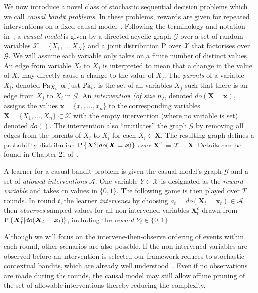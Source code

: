 \newcommand{\bernoulli}{\operatorname{Bernoulli}}
\newcommand{\dirac}{\operatorname{Dirac}}
\renewcommand{\vec}[1]{\boldsymbol{#1}}

We now introduce a novel class of stochastic sequential decision problems which we call \emph{causal bandit problems}. 
In these problems, rewards are given for repeated interventions on a fixed causal model~\cite{Pearl2000}. 
Following the terminology and notation in~\cite{Koller2009}, a \emph{causal model} is given by a directed acyclic graph $\mathcal{G}$ over a set of random variables $\mathcal{X} = \{ X_1, \ldots, X_N \}$ and a joint distribution $\mathrm{P}$ over $\mathcal{X}$ that factorises over $\mathcal{G}$.
We will assume each variable only takes on a finite number of distinct values.
An edge from variable $X_i$ to $X_j$ is interpreted to mean that a change in the value of $X_i$ may directly cause a change to the value of $X_j$.
The \emph{parents} of a variable $X_i$, denoted $\operatorname{Pa}_{X_i}$ or just $\operatorname{Pa}_{i}$, is the set of all variables $X_j$ such that there is an edge from $X_j$ to $X_i$ in $\mathcal{G}$.
An \emph{intervention (of size $n$)}, denoted $do(\vec{X}=\vec{x})$, assigns the values $\vec{x}=\{x_1, \ldots, x_n\}$ to the corresponding variables $\vec{X}=\{X_1, \ldots, X_n\} \subset \mathcal{X}$ with the empty intervention (where no variable is set) denoted $do()$.
The intervention also ``mutilates'' the graph $\mathcal{G}$ by removing all edges from the parents of $X_i$ to $X_i$ for each $X_i \in \vec{X}$. 
The resulting graph defines a probability distribution $\P{\vec{X}^c | do(\vec{X}=\vec{x})}$ over $\vec{X}^c := \mathcal{X} - \vec{X}$. 
Details can be found in Chapter 21 of~\cite{Koller2009}.

A learner for a casual bandit problem is given the casual model's graph $\mathcal{G}$ and a set of \emph{allowed interventions} $\mathcal{A}$.
One variable $Y \in \mathcal{X}$ is designated as the \emph{reward variable} and takes on values in $\{0, 1\}$.
The following game is then played over $T$ rounds.
In round $t$, the learner \emph{intervenes} by choosing $a_t = do(\vec{X}_t = \vec{x}_t) \in \mathcal{A}$ then \emph{observes} sampled values for all non-intervened variables $\vec{X}^c_t$ drawn from $\P{\vec{X}^c_t | do(\vec{X}_t = \vec{x}_t)}$, including the \emph{reward} $Y_t \in \{0,1\}$. 

Although we will focus on the intervene-then-observe ordering of events within each round, other scenarios are also possible. 
If the non-intervened variables are observed before an intervention is selected our framework reduces to stochastic contextual bandits, which are already well understood~\citep{Agarwal2014}. 
Even if no observations are made during the rounds, the causal model may still allow offline pruning of the set of 
allowable interventions thereby reducing the complexity.

